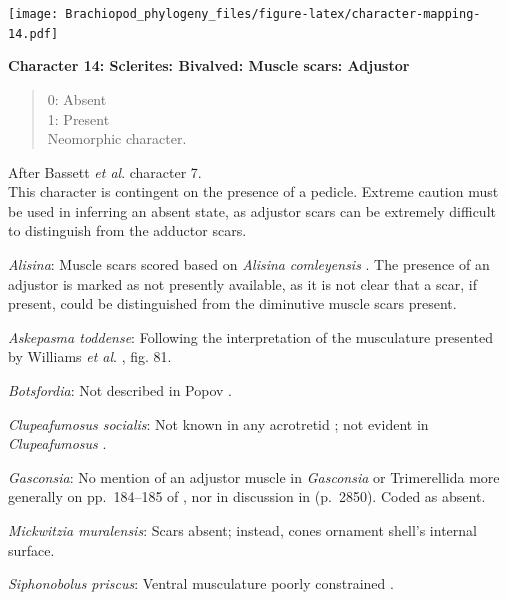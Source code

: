 \documentclass[openany]{book}
\theoremstyle{definition}
\theoremstyle{definition}
\theoremstyle{definition}
\theoremstyle{remark}
\begin{document}
\texttt{[image: Brachiopod\_phylogeny\_files/figure-latex/character-mapping-14.pdf]}

\textbf{Character 14: Sclerites: Bivalved: Muscle scars: Adjustor}

\begin{quote}
0: Absent\\
1: Present\\
Neomorphic character.
\end{quote}

After Bassett \emph{et al}.
\citeyearpar{Bassett2001Functionalmorphology} character 7.\\
This character is contingent on the presence of a pedicle. Extreme
caution must be used in inferring an absent state, as adjustor scars can
be extremely difficult to distinguish from the adductor scars.

\hypertarget{Alisina-coding-14}{}
\emph{Alisina}: Muscle scars scored based on \emph{Alisina}
\emph{comleyensis} \citep{Bassett2001Functionalmorphology}. The presence
of an adjustor is marked as not presently available, as it is not clear
that a scar, if present, could be distinguished from the diminutive
muscle scars present.

\hypertarget{Askepasma_toddense-coding-14}{}
\emph{Askepasma toddense}: Following the interpretation of the
musculature presented by Williams \emph{et al}.
\citeyearpar{Williams2000LinguliformeaCraniiformea}, fig. 81.

\hypertarget{Botsfordia-coding-14}{}
\emph{Botsfordia}: Not described in Popov
\citeyearpar{Popov1992TheCambrian}.

\hypertarget{Clupeafumosus_socialis-coding-14}{}
\emph{Clupeafumosus socialis}: Not known in any acrotretid
\citep{Williams2000LinguliformeaCraniiformea}; not evident in
\emph{Clupeafumosus} \citep{Topper2013Reappraisalof}.

\hypertarget{Gasconsia-coding-14}{}
\emph{Gasconsia}: No mention of an adjustor muscle in \emph{Gasconsia}
or Trimerellida more generally on pp.~184--185 of
\citet{Williams2000LinguliformeaCraniiformea}, nor in discussion in
\citet{Williams2007Supplement} (p.~2850). Coded as absent.

\hypertarget{Mickwitzia_muralensis-coding-14}{}
\emph{Mickwitzia muralensis}: Scars absent; instead, cones ornament
shell's internal surface.

\hypertarget{Siphonobolus_priscus-coding-14}{}
\emph{Siphonobolus priscus}: Ventral musculature poorly constrained
\citep{Williams2000LinguliformeaCraniiformea, Popov2009Earlyontogeny}.
\end{document}
